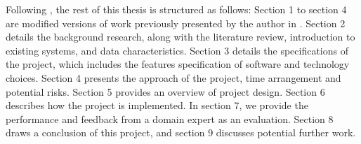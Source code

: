 Following \cite{Laramee2011}, the rest of this thesis is structured as follows: Section 1 to section 4 are modified versions of work previously presented by the author in \cite{Liu}. Section 2 details the background research, along with the literature review, introduction to existing systems, and data characteristics. Section 3 details the specifications of the project, which includes the features specification of software and technology choices. Section 4 presents the approach of the project, time arrangement and potential risks. Section 5 provides an overview of project design. Section 6 describes how the project is implemented. In section 7, we provide the performance and feedback from a domain expert as an evaluation. Section 8 draws a conclusion of this project, and section 9 discusses potential further work. 



